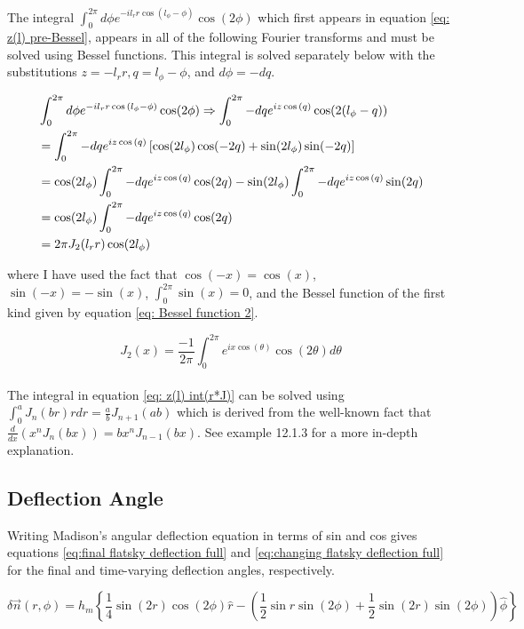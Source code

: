 \documentclass{article}
\begin{document}
The integral $\int_0^{2\pi} d\phi  e^{-il_rr\cos{(l_\phi - \phi)}} \cos(2\phi)$ which first appears in equation \ref{eq: z(l) pre-Bessel}, appears in all of the following Fourier transforms and must be solved using Bessel functions. This integral is solved separately below with the substitutions $z=-l_rr, q = l_\phi - \phi$, and $d\phi = -dq$. 

\begin{align}
    &\int_0^{2\pi} d\phi  e^{-il_rr\cos{(l_\phi - \phi)}} \cos(2\phi) \Rightarrow \int_0^{2\pi} -dq  e^{iz\cos{(q)}} \cos(2(l_\phi -q)) \notag \\
    &= \int_0^{2\pi} -dq  e^{iz\cos{(q)}} \left[\cos(2l_\phi)\cos(-2q) + \sin(2l_\phi)\sin(-2q)\right] \notag \\
    &= \cos(2l_\phi)\int_0^{2\pi} -dq  e^{iz\cos{(q)}}\cos(2q) - \sin(2l_\phi)\int_0^{2\pi} -dq e^{iz\cos{(q)}}\sin(2q)  \notag \\ 
    &= \cos(2l_\phi)\int_0^{2\pi} -dq  e^{iz\cos{(q)}}\cos(2q) \notag \\
    &= 2\pi J_2(l_rr)\cos(2l_\phi)
\end{align}

where I have used the fact that $\cos(-x) = \cos(x)$, $\sin(-x) = -\sin(x)$, $\int_0^{2\pi}\sin(x) = 0$, and the Bessel function of the first kind given by equation \ref{eq: Bessel function 2}. 

\begin{equation}
    J_2(x) = \frac{-1}{2\pi}\int_0^{2\pi}e^{ix\cos{(\theta)}}\cos(2\theta)d\theta
    \label{eq: Bessel function 2}
\end{equation}
\\

The integral in equation \ref{eq: z(l) int(r*J)} can be solved using $\int_0^aJ_n(br)rdr = \frac{a}{b}J_{n+1}(ab)$ which is derived from the well-known fact that $\frac{d}{dx}\left(x^nJ_n(bx)\right) = bx^nJ_{n-1}(bx).$ See \cite{glaisher1871essential} example 12.1.3 for a more in-depth explanation.


\subsection{Deflection Angle}
Writing Madison's angular deflection equation in terms of sin and cos gives equations \ref{eq:final flatsky deflection full} and \ref{eq:changing flatsky deflection full} for the final and time-varying deflection angles, respectively. 

\begin{equation}
    \delta\vec{n}(r,\phi) =  h_m\left\{\frac{1}{4} \sin (2 r) \cos (2 \phi) \hat{r} - \left(\frac{1}{2} \sin r \sin (2 \phi)+\frac{1}{2} \sin (2 r) \sin (2 \phi)\right) \hat{\phi}\right\} 
    \label{eq:final flatsky deflection full}
\end{equation}
\end{document}
